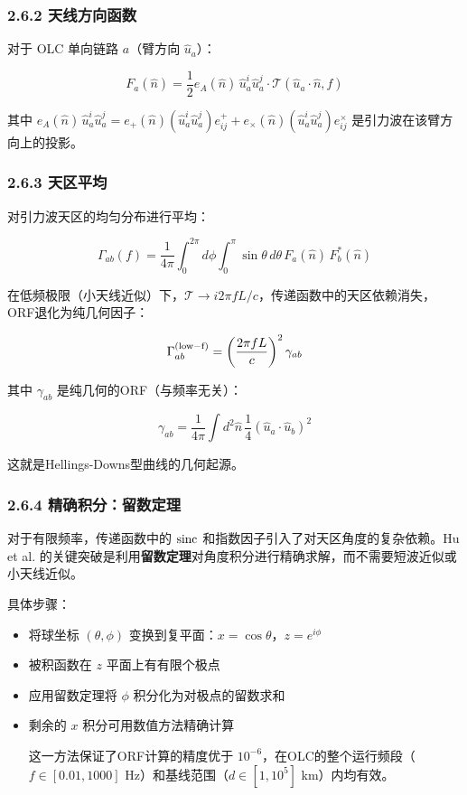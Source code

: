 \documentclass[12pt,a4paper]{article}
\begin{document}
\subsubsection{2.6.2 天线方向函数}


对于 OLC 单向链路 $a$（臂方向 $\hat{u}_a$）：

$$F_a(\hat{n}) = \frac{1}{2} e_A(\hat{n})\, \hat{u}_a^i \hat{u}_a^j \cdot \mathcal{T}(\hat{u}_a\cdot\hat{n}, f)$$

其中 $e_A(\hat{n})\, \hat{u}_a^i \hat{u}_a^j = e_+(\hat{n}) (\hat{u}_a^i \hat{u}_a^j)e_{ij}^+ + e_\times(\hat{n}) (\hat{u}_a^i \hat{u}_a^j)e_{ij}^\times$ 是引力波在该臂方向上的投影。

\subsubsection{2.6.3 天区平均}


对引力波天区的均匀分布进行平均：

$$\Gamma_{ab}(f) = \frac{1}{4\pi} \int_0^{2\pi} d\phi \int_0^\pi \sin\theta\, d\theta\, F_a(\hat{n})\, F_b^*(\hat{n})$$

在低频极限（小天线近似）下，$\mathcal{T} \to i2\pi f L/c$，传递函数中的天区依赖消失，ORF退化为纯几何因子：

$$\Gamma_{ab}^{\rm (low-f)} = \left(\frac{2\pi f L}{c}\right)^2 \gamma_{ab}$$

其中 $\gamma_{ab}$ 是纯几何的ORF（与频率无关）：

$$\gamma_{ab} = \frac{1}{4\pi} \int d^2\hat{n}\, \frac{1}{4}(\hat{u}_a \cdot \hat{u}_b)^2$$

这就是Hellings-Downs型曲线的几何起源。

\subsubsection{2.6.4 精确积分：留数定理}


对于有限频率，传递函数中的 ${\rm sinc}$ 和指数因子引入了对天区角度的复杂依赖。Hu et al. 的关键突破是利用\textbf{留数定理}对角度积分进行精确求解，而不需要短波近似或小天线近似。

具体步骤：
\begin{itemize}
  \item[1] 将球坐标 $(\theta, \phi)$ 变换到复平面：$x = \cos\theta$，$z = e^{i\phi}$
  \item[2] 被积函数在 $z$ 平面上有有限个极点
  \item[3] 应用留数定理将 $\phi$ 积分化为对极点的留数求和
  \item[4] 剩余的 $x$ 积分可用数值方法精确计算

这一方法保证了ORF计算的精度优于 $10^{-6}$，在OLC的整个运行频段（$f \in [0.01, 1000]$ Hz）和基线范围（$d \in [1, 10^5]$ km）内均有效。

\end{itemize}
\end{document}
